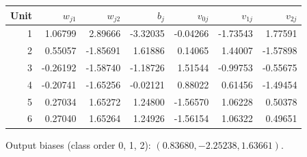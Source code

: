 \begin{center}\begin{tabular}{rrrrrrr}
\toprule
Unit & $w_{j1}$ & $w_{j2}$ & $b_j$ & $v_{0j}$ & $v_{1j}$ & $v_{2j}$\\
\midrule
1 & 1.06799 & 2.89666 & -3.32035 & -0.04266 & -1.73543 & 1.77591\\
2 & 0.55057 & -1.85691 & 1.61886 & 0.14065 & 1.44007 & -1.57898\\
3 & -0.26192 & -1.58740 & -1.18726 & 1.51544 & -0.99753 & -0.55675\\
4 & -0.20741 & -1.65256 & -0.02121 & 0.88022 & 0.61456 & -1.49454\\
5 & 0.27034 & 1.65272 & 1.24800 & -1.56570 & 1.06228 & 0.50378\\
6 & 0.27040 & 1.65264 & 1.24926 & -1.56154 & 1.06322 & 0.49651\\
\bottomrule
\end{tabular}\end{center}
Output biases (class order 0, 1, 2): $(0.83680, -2.25238, 1.63661)$.
